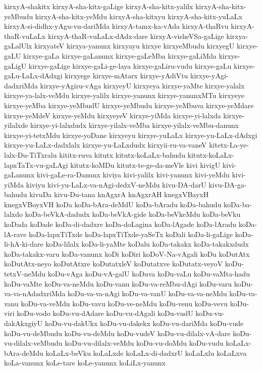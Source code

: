 {kirxyA-shakitx
kirxyA-sha-kitx-gaLige
kirxyA-sha-kitx-yalilx
kirxyA-sha-kitx-yeMbudu
kirxyA-sha-kitx-yeMdu
kirxyA-sha-kitxyu
kirxyA-sha-kitx-yuLaLx
kirxyA-si-didhx-yAgu-vu-dariMda
kirxyA-tamx-ka-vAda
kirxyA-thaRvu
kirxyA-thaR-vuLaLx
kirxyA-thaR-vuLaLx-dAdx-dare
kirxyA-visheVSa-gaLige
kirxya-gaLalUlx
kirxyateV
kirxya-yanunx
kirxyayu
kirxye
kirxyeMbudu
kirxyegU
kirxye-gaLU
kirxye-gaLa
kirxye-gaLanunx
kirxye-gaLeMba
kirxye-gaLiMda
kirxye-gaLigU
kirxye-gaLige
kirxye-gaLi-ge-laya
kirxye-gaLiru-vudu
kirxye-gaLu
kirxye-gaLu-LaLx-dAdxgi
kirxyege
kirxye-mAtarx
kirxye-yAdiVtu
kirxye-yAgi-dadxriMda
kirxye-yAgiru-vAga
kirxyeyU
kirxyeya
kirxye-yaMte
kirxye-yalalx
kirxye-ya-lalx-veMdu
kirxye-yalilx
kirxye-yanunx
kirxye-yanunxMTu
kirxyeye
kirxye-yeMba
kirxye-yeMbudU
kirxye-yeMbudu
kirxye-yeMbuva
kirxye-yeMdare
kirxye-yeMdeV
kirxye-yeMdu
kirxyeyeV
kirxye-yiMda
kirxye-yi-lalxda
kirxye-yilalxde
kirxye-yi-lalxdudx
kirxye-yilalx-veMba
kirxye-yilalx-veMbu-danunx
kirxye-yi-tetxMdu
kirxye-yoDane
kirxyeyu
kirxye-yuLaLx
kirxye-yu-LaLx-dAdxgi
kirxye-yu-LaLx-dadxlalx
kirxye-yu-LaLxdudx
kirxyii-ru-va-vaneV
kitetx-La-ye-lalx-Du-TiTxralu
kititx-ruva
kitutx
kitutx-koLaLx-bahudu
kitutx-koLaLx-lapxTaTx-vu-gaLAgi
kitutx-koMDu
kitutx-te-ge-da-meVle
kivi
kivigU
kivi-gaLanunx
kivi-gaLe-ra-Danunx
kiviya
kivi-yalilx
kivi-yanunx
kivi-yeMdu
kivi-yiMda
kiviyu
kivi-yu-LaLx-va-nAgi-dedxV-neMdu
kivu-DA-darU
kivu-DA-ga-bahudu
kivuDa
kivu-Du-tana
knAgxrA
knAgxrAH
knegxVBayxH
knegxVBoyxVH
koDa
koDa-bAra-deMdU
koDa-bAradu
koDa-bahudu
koDa-ba-lalxdo
koDa-beVkA-dadudx
koDa-beVkA-gide
koDa-beVkeMdu
koDa-beVku
koDada
koDade
koDa-di-dadxre
koDa-doLagina
koDa-lAgade
koDa-lAradu
koDa-lA-rave
koDa-lapxTiTxde
koDa-lapxTiTxde-yaSeTx
koDali
koDa-li-gaLige
koDa-li-hA-ki-dare
koDa-lilalx
koDa-li-yaMte
koDalu
koDa-takakx
koDa-takakxdudx
koDa-takakx-varu
koDa-vanunx
koDi
koDiri
koDoV-Na-vAgali
koDu
koDutAtx
koDutAtx-neyo
koDutAtxre
koDutatxleV
koDutatxve
koDutatx-veyoV
koDu-tetxV-neMdu
koDu-vAga
koDu-vA-galU
koDuva
koDu-vaLu
koDu-vaMta-hadu
koDu-vaMte
koDu-va-neMdu
koDu-vanu
koDu-va-reMbu-dAgi
koDu-varu
koDu-va-va-nAdadxriMda
koDu-va-va-nAgi
koDu-va-vanU
koDu-va-va-neMdu
koDu-va-vanu
koDu-va-veMdu
koDu-vavu
koDu-ve-neMdu
koDu-venu
koDu-vevu
koDu-viri
koDu-vodo
koDu-vu-dAdare
koDu-vu-dAgali
koDu-vudU
koDu-vu-dakAkxgiyU
koDu-vu-dakUkx
koDu-vu-dakekx
koDu-vu-dariMda
koDu-vude
koDu-vu-deMbudu
koDu-vu-deMdu
koDu-vudeV
koDu-vu-dilalx-vA-dare
koDu-vu-dilalx-veMbudu
koDu-vu-dilalx-veMdu
koDu-vu-doMdu
koDu-vudu
koLaLx-bAra-deMdu
koLaLx-beVku
koLaLxde
koLaLx-di-dadxrU
koLaLxlu
koLaLxva
koLa-vanunx
koLe-tare
koLe-yanunx
koLiLx-yanunx
}
